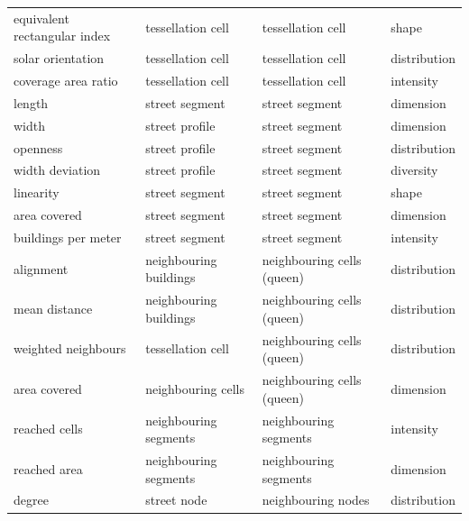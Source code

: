 \begin{longtable}{p{5cm}p{4cm}p{4cm}l}
            equivalent rectangular index &               tessellation cell &          tessellation cell &        shape \\
                       solar orientation &               tessellation cell &          tessellation cell & distribution \\
                     coverage area ratio &               tessellation cell &          tessellation cell &    intensity \\
                                  length &                  street segment &             street segment &    dimension \\
                                   width &                  street profile &             street segment &    dimension \\
                                openness &                  street profile &             street segment & distribution \\
                         width deviation &                  street profile &             street segment &    diversity \\
                               linearity &                  street segment &             street segment &        shape \\
                            area covered &                  street segment &             street segment &    dimension \\
                     buildings per meter &                  street segment &             street segment &    intensity \\
                               alignment &          neighbouring buildings & neighbouring cells (queen) & distribution \\
                           mean distance &          neighbouring buildings & neighbouring cells (queen) & distribution \\
                     weighted neighbours &               tessellation cell & neighbouring cells (queen) & distribution \\
                            area covered &              neighbouring cells & neighbouring cells (queen) &    dimension \\
                           reached cells &           neighbouring segments &      neighbouring segments &    intensity \\
                            reached area &           neighbouring segments &      neighbouring segments &    dimension \\
                                  degree &                     street node &         neighbouring nodes & distribution \\

\end{longtable}

